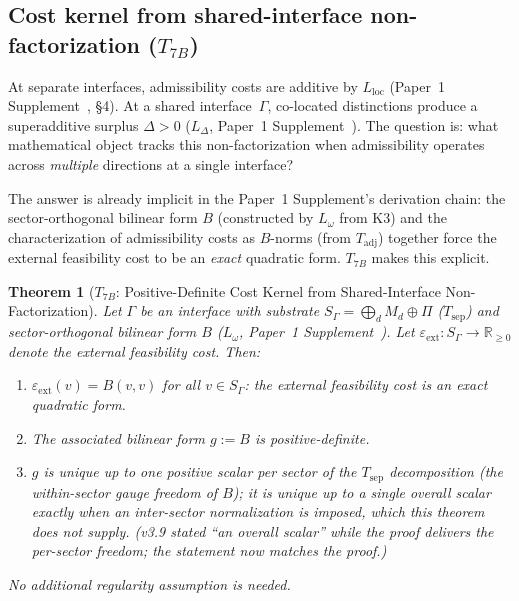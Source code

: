 \documentclass[11pt]{article}
\newtheorem{theorem}{Theorem}[section]
\theoremstyle{definition}
\begin{document}
\subsection{Cost kernel from shared-interface non-factorization ($T_{7B}$)}
\label{sec:T7B}

At separate interfaces, admissibility costs are additive by $L_{\mathrm{loc}}$
(Paper~1 Supplement~\cite{BrookeSupplement}, \S4).  At a shared interface~$\Gamma$, co-located
distinctions produce a superadditive surplus $\Delta > 0$ ($L_\Delta$, Paper~1 Supplement~\cite{BrookeSupplement}).  The question is: what mathematical object
tracks this non-factorization when admissibility operates across
\emph{multiple} directions at a single interface?

The answer is already implicit in the Paper~1 Supplement's derivation
chain: the sector-orthogonal bilinear form $B$ (constructed by $L_\omega$
from K3) and the characterization of admissibility costs as $B$-norms
(from $T_{\mathrm{adj}}$) together force the external feasibility cost
to be an \emph{exact} quadratic form.  $T_{7B}$ makes this explicit.

\begin{theorem}[$T_{7B}$: Positive-Definite Cost Kernel from
Shared-Interface Non-Factorization]\label{thm:T7B}
Let $\Gamma$ be an interface with substrate $S_\Gamma =
\bigoplus_d M_d \oplus \Pi$ ($T_{\mathrm{sep}}$) and sector-orthogonal
bilinear form $B$ ($L_\omega$, Paper~1 Supplement~\cite{BrookeSupplement}).
Let $\varepsilon_{\mathrm{ext}}: S_\Gamma \to \mathbb{R}_{\ge 0}$ denote
the external feasibility cost.  Then:
\begin{enumerate}[label=(\roman*),nosep]
  \item $\varepsilon_{\mathrm{ext}}(v) = B(v,v)$ for all $v \in S_\Gamma$:
        the external feasibility cost is an exact quadratic form.
  \item The associated bilinear form $g := B$ is positive-definite.
  \item $g$ is unique up to one positive scalar \emph{per sector} of the
        $T_{\mathrm{sep}}$ decomposition (the within-sector gauge freedom
        of $B$); it is unique up to a single overall scalar exactly when
        an inter-sector normalization is imposed, which this theorem
        does not supply.  (v3.9 stated ``an overall scalar'' while the
        proof delivers the per-sector freedom; the statement now matches
        the proof.)
\end{enumerate}
No additional regularity assumption is needed.
\end{theorem}
\end{document}
